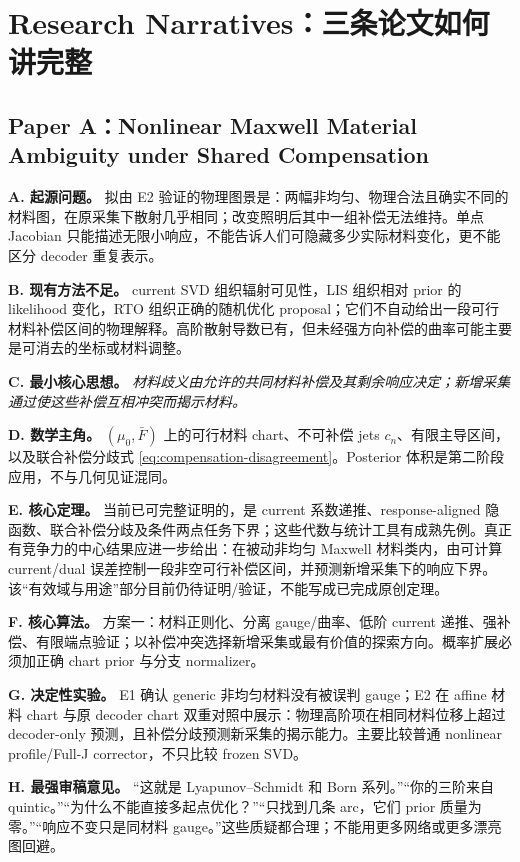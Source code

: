 \section{Research Narratives：三条论文如何讲完整}
\label{sec:narratives}

\subsection{Paper A：Nonlinear Maxwell Material Ambiguity under Shared Compensation}
\textbf{A. 起源问题。} 拟由 E2 验证的物理图景是：两幅非均匀、物理合法且确实不同的材料图，在原采集下散射几乎相同；改变照明后其中一组补偿无法维持。单点 Jacobian 只能描述无限小响应，不能告诉人们可隐藏多少实际材料变化，更不能区分 decoder 重复表示。

\textbf{B. 现有方法不足。} current SVD 组织辐射可见性，LIS 组织相对 prior 的 likelihood 变化，RTO 组织正确的随机优化 proposal；它们不自动给出一段可行材料补偿区间的物理解释。高阶散射导数已有，但未经强方向补偿的曲率可能主要是可消去的坐标或材料调整。

\textbf{C. 最小核心思想。} \emph{材料歧义由允许的共同材料补偿及其剩余响应决定；新增采集通过使这些补偿互相冲突而揭示材料。}

\textbf{D. 数学主角。} $(\mu_0,\bar F)$ 上的可行材料 chart、不可补偿 jets $c_n$、有限主导区间，以及联合补偿分歧式 \eqref{eq:compensation-disagreement}。Posterior 体积是第二阶段应用，不与几何见证混同。

\textbf{E. 核心定理。} 当前已可完整证明的，是 current 系数递推、response-aligned 隐函数、联合补偿分歧及条件两点任务下界；这些代数与统计工具有成熟先例。真正有竞争力的中心结果应进一步给出：在被动非均匀 Maxwell 材料类内，由可计算 current/dual 误差控制一段非空可行补偿区间，并预测新增采集下的响应下界。该“有效域与用途”部分目前仍待证明/验证，不能写成已完成原创定理。

\textbf{F. 核心算法。} 方案一：材料正则化、分离 gauge/曲率、低阶 current 递推、强补偿、有限端点验证；以补偿冲突选择新增采集或最有价值的探索方向。概率扩展必须加正确 chart prior 与分支 normalizer。

\textbf{G. 决定性实验。} E1 确认 generic 非均匀材料没有被误判 gauge；E2 在 affine 材料 chart 与原 decoder chart 双重对照中展示：物理高阶项在相同材料位移上超过 decoder-only 预测，且补偿分歧预测新采集的揭示能力。主要比较普通 nonlinear profile/Full-J corrector，不只比较 frozen SVD。

\textbf{H. 最强审稿意见。} “这就是 Lyapunov--Schmidt 和 Born 系列。”“你的三阶来自 quintic。”“为什么不能直接多起点优化？”“只找到几条 arc，它们 prior 质量为零。”“响应不变只是同材料 gauge。”这些质疑都合理；不能用更多网络或更多漂亮图回避。

